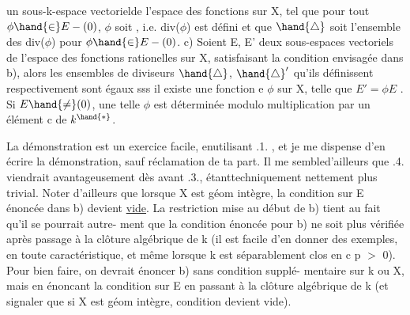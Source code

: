
un sous-k-espace vectorielde l'espace des  fonctions    
sur X, tel que pour tout $\phi \hand{\in} E-(0)$, $\phi$ soit  
  , i.e. div($\phi$) est défini 
\unsure{\hand{,}} et que $\hand{\triangle}$ soit l'ensemble des div($\phi$) pour $\phi \hand{\in} E-(0)$.
c) Soient E, E' deux sous-espaces vectoriels de l'espace des
fonctions rationelles   sur X,  satisfaisant la condition
envisagée dans b), alors les ensembles de diviseurs $\hand{\triangle}$, $\hand{\triangle}'$ qu'ils
définissent respectivement sont égaux sss il existe une  fonction
e   $\phi$ sur X, telle que $E' = \phi E$ . Si $E\hand{\neq}(0)$, une
telle $\phi$ est déterminée modulo multiplication par un élément c de $k^{\hand{*}}$.

La démonstration est un exercice facile, enutilisant \hand{\S}.1. , et je
me dispense d'en écrire la démonstration, sauf réclamation de ta part. Il
\margin{||} me sembled'ailleurs que \hand{\S}.4. viendrait avantageusement dès avant \hand{\S}.3.,
étanttechniquement nettement plus trivial. Noter d'ailleurs que lorsque
X est géom intègre, la condition sur E énoncée dans b) devient \uline{vide}.
La restriction mise au début de b) tient au fait qu'il se pourrait autre-%
ment que la condition énoncée pour b) ne soit plus vérifiée après passage
à la clôture algébrique de k (il est facile d'en donner des exemples,
en toute caractéristique, et même lorsque k est séparablement clos en
c p $>$ 0). Pour bien faire, on devrait énoncer b) sans condition supplé-%
mentaire sur k ou X, mais en énoncant la condition sur E en passant à la
clôture algébrique de k (et signaler que si X est géom intègre, 
condition devient vide). 

